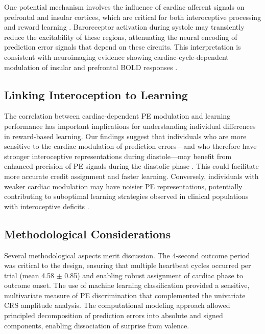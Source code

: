 \documentclass[12pt]{article}
\begin{document}
One potential mechanism involves the influence of cardiac afferent signals on prefrontal and insular cortices, which are critical for both interoceptive processing and reward learning \citep{critchley2015neural, behrens2007learning}. Baroreceptor activation during systole may transiently reduce the excitability of these regions, attenuating the neural encoding of prediction error signals that depend on these circuits. This interpretation is consistent with neuroimaging evidence showing cardiac-cycle-dependent modulation of insular and prefrontal BOLD responses \citep{garfinkel2015knowing}.

\subsection{Linking Interoception to Learning}

The correlation between cardiac-dependent PE modulation and learning performance has important implications for understanding individual differences in reward-based learning. Our findings suggest that individuals who are more sensitive to the cardiac modulation of prediction errors---and who therefore have stronger interoceptive representations during diastole---may benefit from enhanced precision of PE signals during the diastolic phase \citep{seth2013interoceptive}. This could facilitate more accurate credit assignment and faster learning. Conversely, individuals with weaker cardiac modulation may have noisier PE representations, potentially contributing to suboptimal learning strategies observed in clinical populations with interoceptive deficits \citep{paulus2010interoception, khalsa2018interoception}.

\subsection{Methodological Considerations}

Several methodological aspects merit discussion. The 4-second outcome period was critical to the design, ensuring that multiple heartbeat cycles occurred per trial (mean 4.58 $\pm$ 0.85) and enabling robust assignment of cardiac phase to outcome onset. The use of machine learning classification provided a sensitive, multivariate measure of PE discrimination that complemented the univariate CRS amplitude analysis. The computational modeling approach allowed principled decomposition of prediction errors into absolute and signed components, enabling dissociation of surprise from valence.
\end{document}
